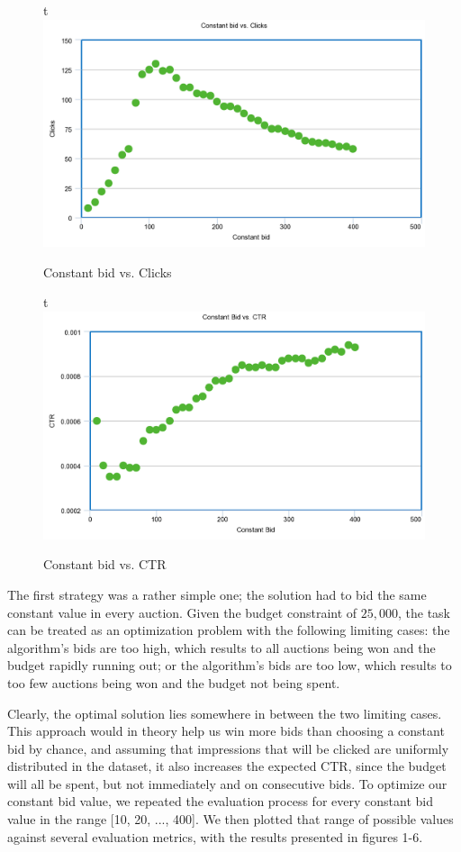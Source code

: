 \documentclass{sig-alternate-05-2015}
\begin{document}
\begin{figure}{t}
  \includegraphics[width=\linewidth]{constant_clicks.png}
  \caption{Constant bid vs. Clicks}
  \label{fig:clicks}
\end{figure}

\begin{figure}{t}
  \includegraphics[width=\linewidth]{constant_ctr.png}
  \caption{Constant bid vs. CTR}
  \label{fig:CPM}
\end{figure}

The first strategy was a rather simple one; the solution had to bid the same constant value in every auction. Given the budget constraint of $25,000$, the task can be treated as an optimization problem with the following limiting cases: the algorithm's bids are too high, which results to all auctions being won and the budget rapidly running out; or the algorithm's bids are too low, which results to too few auctions being won and the budget not being spent. 

Clearly, the optimal solution lies somewhere in between the two limiting cases. This approach would in theory help us win more bids than choosing a constant bid by chance, and assuming that impressions that will be clicked are uniformly distributed in the dataset, it also increases the expected CTR, since the budget will all be spent, but not immediately and on consecutive bids. To optimize our constant bid value, we repeated the evaluation process for every constant bid value in the range [10, 20, ..., 400]. We then plotted that range of possible values against several evaluation metrics, with the results presented in figures 1-6.
\end{document}
